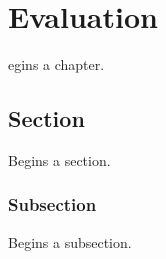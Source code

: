 \let\textcircled=\pgftextcircled
\chapter{Evaluation}
\label{chap:evaluation}

egins a chapter. 

\section{Section}
\label{sec:sec01}

Begins a section.

\subsection{Subsection}
\label{subsec:subsec01}

Begins a subsection.